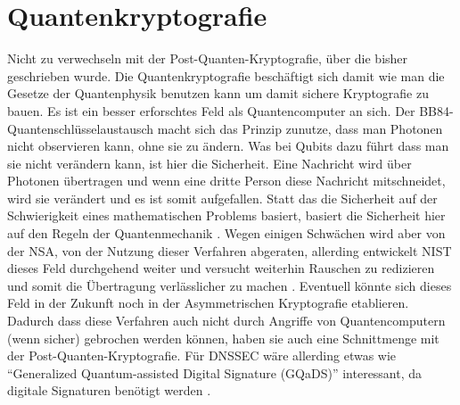 \section{Quantenkryptografie}
Nicht zu verwechseln mit der Post-Quanten-Kryptografie, über die bisher geschrieben wurde.
Die Quantenkryptografie beschäftigt sich damit wie man die Gesetze der Quantenphysik benutzen kann um damit sichere Kryptografie zu bauen.
Es ist ein besser erforschtes Feld als Quantencomputer an sich.
Der BB84-Quantenschlüsselaustausch macht sich das Prinzip zunutze, dass man Photonen nicht observieren kann, ohne sie zu ändern.
Was bei Qubits dazu führt dass man sie nicht verändern kann, ist hier die Sicherheit.
Eine Nachricht wird über Photonen übertragen und wenn eine dritte Person diese Nachricht mitschneidet, wird sie verändert und es ist somit aufgefallen.
Statt das die Sicherheit auf der Schwierigkeit eines mathematischen Problems basiert, basiert die Sicherheit hier auf den Regeln der Quantenmechanik \cite{schmehQuantencomputer2026,ahonenEntanglementEnhancedQuantumKey2009}.
Wegen einigen Schwächen wird aber von der NSA, von der Nutzung dieser Verfahren abgeraten, allerding entwickelt NIST dieses Feld durchgehend weiter und versucht weiterhin Rauschen zu redizieren und somit die Übertragung verlässlicher zu machen \cite{WhatQuantumCryptography2025}.
Eventuell könnte sich dieses Feld in der Zukunft noch in der Asymmetrischen Kryptografie etablieren.
Dadurch dass diese Verfahren auch nicht durch Angriffe von Quantencomputern (wenn sicher) gebrochen werden können, haben sie auch eine Schnittmenge mit der Post-Quanten-Kryptografie.
Für DNSSEC wäre allerding etwas wie \enquote{Generalized Quantum-assisted Digital Signature (GQaDS)} interessant, da digitale Signaturen benötigt werden \cite{tarableGeneralizedQuantumassistedDigital2024}.
